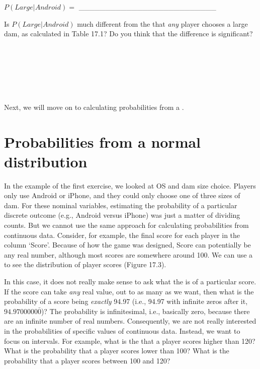 \documentclass[
  openany]{krantz}
\begin{document}
\(P(Large | Android) =\) \_\_\_\_\_\_\_\_\_\_\_\_\_\_\_\_\_\_\_\_\_\_\_\_\_\_

Is \(P(Large | Android)\) much different from the  that \emph{any} player chooses a large dam, as calculated in Table 17.1? Do you think that the difference is significant?

\begin{verbatim}






\end{verbatim}

Next, we will move on to calculating probabilities from a .

\hypertarget{probabilities-from-a-normal-distribution}{%
\section{Probabilities from a normal distribution}\label{probabilities-from-a-normal-distribution}}

In the example of the first exercise, we looked at OS and dam size choice.
Players only use Android or iPhone, and they could only choose one of three sizes of dam.
For these nominal variables, estimating the probability of a particular discrete outcome (e.g., Android versus iPhone) was just a matter of dividing counts.
But we cannot use the same approach for calculating probabilities from continuous data.
Consider, for example, the final score for each player in the column `Score'.
Because of how the game was designed, Score can potentially be any real number, although most scores are somewhere around 100.
We can use a  to see the distribution of player scores (Figure 17.3).

In this case, it does not really make sense to ask what the  is of a particular score.
If the score can take \emph{any} real value, out to as many  as we want, then what is the probability of a score being \emph{exactly} 94.97 (i.e., 94.97 with infinite zeros after it, \(94.9700000\bar{0}\))?
The probability is infinitesimal, i.e., basically zero, because there are an infinite number of real numbers.
Consequently, we are not really interested in the probabilities of specific values of continuous data.
Instead, we want to focus on intervals.
For example, what is the  that a player scores higher than 120?
What is the probability that a player scores lower than 100?
What is the probability that a player scores between 100 and 120?
\end{document}
